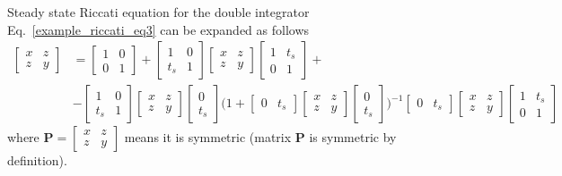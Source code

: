 \documentclass[12pt,a4paper,oneside]{book}
\begin{document}
\begin{onehalfspace}
\begin{example}{Steady state Riccati equation for the double integrator}
Eq.~\eqref{example_riccati_eq3} can be expanded as follows
\begin{equation}\label{example_riccati_eq4}
	\begin{aligned}
		\begin{bmatrix}x&z\\z&y\end{bmatrix} &=\begin{bmatrix}1&0\\0&1\end{bmatrix} + 
		\begin{bmatrix}1&0\\t_s&1\end{bmatrix}\begin{bmatrix}x&z\\z&y\end{bmatrix}\begin{bmatrix}1&t_s\\0&1\end{bmatrix}+ \\[6pt]
		&-\begin{bmatrix}1&0\\t_s&1\end{bmatrix}\begin{bmatrix}x&z\\z&y\end{bmatrix}\begin{bmatrix}0\\t_s\end{bmatrix}
		\Bigg(1+\begin{bmatrix}0&t_s\end{bmatrix}\begin{bmatrix}x&z\\z&y\end{bmatrix}\begin{bmatrix}0\\t_s\end{bmatrix}\Bigg)^{-1}\begin{bmatrix}0&t_s\end{bmatrix}\begin{bmatrix}x&z\\z&y\end{bmatrix}\begin{bmatrix}1&t_s\\0&1\end{bmatrix}
	\end{aligned}
\end{equation}
where $\mathbf{P}=\begin{bmatrix}x&z\\z&y\end{bmatrix}$ means it is symmetric 
(matrix $\mathbf{P}$ is symmetric by definition).


\end{example}
\end{onehalfspace}
\end{document}
